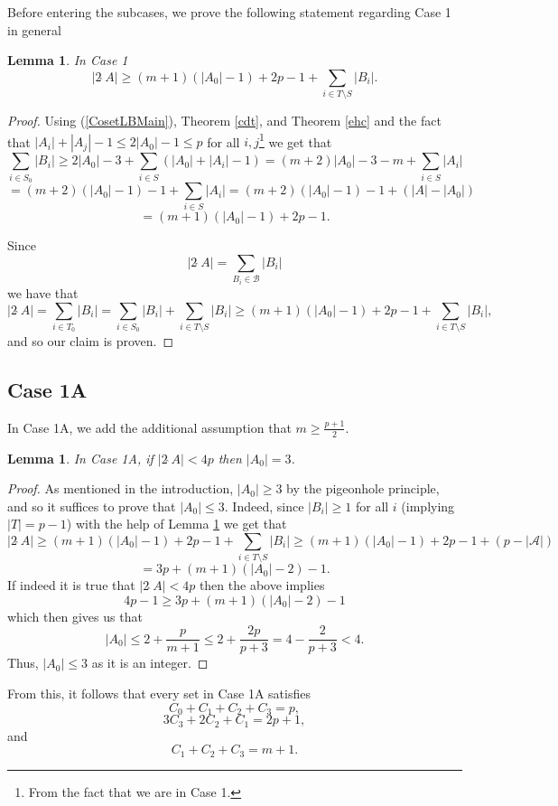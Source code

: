 \documentclass[a4paper, 12pt]{article}\usepackage[english]{babel}
\newtheorem{lem}[thm]{Lemma}
\newcommand{\A}{\mathcal{A}}
\newcommand{\B}{\mathcal{B}}
\newcommand{\<}{\langle}
\begin{document}
Before entering the subcases, we prove the following statement regarding Case 1 in general
\begin{lem}\label{Case1Backbone}
In Case 1
\[|2\hat{\;}A|\geq (m+1)(|A_0|-1)+2p-1+\sum_{i\in T\setminus S}|B_i|.\]
\end{lem}
\begin{proof}
Using (\ref{CosetLBMain}), Theorem \ref{cdt}, and Theorem \ref{ehc} and the fact that $|A_i|+|A_j|-1\leq 2|A_0|-1\leq p$ for all $i,j$\footnote{From the fact that we are in Case 1.} we get that
    \[\sum_{i\in S_0}|B_i|\geq 2|A_0|-3+\sum_{i\in S}\left(|A_0|+|A_i|-1\right)=(m+2)|A_0|-3-m+\sum_{i\in S}|A_i|\]\[=(m+2)(|A_0|-1)-1+\sum_{i\in S}|A_i|=(m+2)(|A_0|-1)-1+(|A|- |A_0|)\]\[=(m+1)(|A_0|-1)+2p-1.\]

Since\[|2\hat{\;}A|=\sum_{B_i\in \B}|B_i|\] we have that 
\[|2\hat{\;}A|=\sum_{i\in T_0}|B_i|=\sum_{i\in S_0}|B_i|+\sum_{i\in T\setminus S}|B_i|\geq (m+1)(|A_0|-1)+2p-1+\sum_{i\in T\setminus S}|B_i|,\] and so our claim is proven.
\end{proof}



\subsection{Case 1A}

In Case 1A, we add the additional assumption that $m\geq \frac{p+1}{2}$.


\begin{lem}
    In Case 1A, if $|2\hat{\;}A|<4p$ then $|A_0|= 3$.
\end{lem}
\begin{proof}
    As mentioned in the introduction, $|A_0|\geq 3$ by the pigeonhole principle, and so it suffices to prove that $|A_0|\leq 3$. 
    Indeed, since $|B_i|\geq 1$ for all $i$ (implying $|T|=p-1$) with the help of Lemma \ref{Case1Backbone}  we get that \[|2\hat{\;}A|\geq (m+1)(|A_0|-1)+2p-1+\sum_{i\in T\setminus S}|B_i|\geq (m+1)(|A_0|-1)+2p-1+(p-|\A|)\] 
    \[=3p+(m+1)(|A_0|-2)-1.\] If indeed it is true that $|2\hat{\;}A|<4p$ then the above implies \[4p-1\geq 3p+(m+1)(|A_0|-2)-1\] which then gives us that \[ |A_0|\leq 2+\frac{p}{m+1}\leq 2+\frac{2p}{p+3}=4-\frac{2}{p+3}<4.\] Thus, $|A_0|\leq 3$ as it is an integer.
\end{proof}

From this, it follows that every set in Case 1A satisfies \begin{equation}\label{Csum1}
    C_0+C_1+C_2+C_3=p,
\end{equation}
\begin{equation}\label{Csum2}
    3C_3+2C_2+C_1=2p+1,
\end{equation} and \begin{equation}\label{Csum3}
    C_1+C_2+C_3=m+1.
\end{equation}
\end{document}
